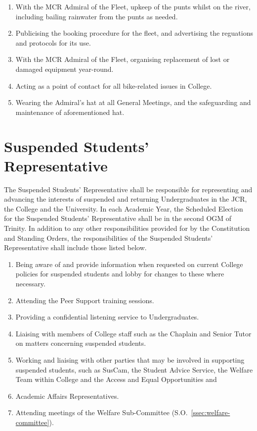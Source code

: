 \begin{enumerate}
	\item With the MCR Admiral of the Fleet, upkeep of the punts whilst on the river, including bailing rainwater from the punts as needed.
	\item Publicising the booking procedure for the fleet, and advertising the reguations and protocols for its use.
	\item With the MCR Admiral of the Fleet, organising replacement of lost or damaged equipment year-round.
	\item Acting as a point of contact for all bike-related issues in College.
	\item Wearing the Admiral's hat at all General Meetings, and the safeguarding and maintenance of aforementioned hat.
\end{enumerate}
\section{Suspended Students' Representative}
\npara The Suspended Students' Representative shall be responsible for representing  and advancing the interests of suspended and returning Undergraduates in the JCR, the College and the University.
\npara In each Academic Year, the Scheduled Election for the Suspended Students' Representative shall be in the second OGM of Trinity.
\npara In addition to any other responsibilities provided for by the Constitution and Standing Orders, the responsibilities of the Suspended Students' Representative shall include those listed below.
\begin{enumerate}
	\item Being aware of and provide information when requested on current College policies for suspended students and lobby for changes to these where necessary.
	\item Attending the Peer Support training sessions.
	\item Providing a confidential listening service to Undergraduates.
	\item Liaising with members of College staff such as the Chaplain and Senior Tutor on matters concerning suspended students.
	\item Working and liaising with other parties that may be involved in supporting suspended students, such as SusCam, the Student Advice Service, the Welfare Team within College and the Access and Equal Opportunities and \item Academic Affairs Representatives.
	\item Attending meetings of the Welfare Sub-Committee (S.O.~\ref{ssec:welfare-committee}).
\end{enumerate}
